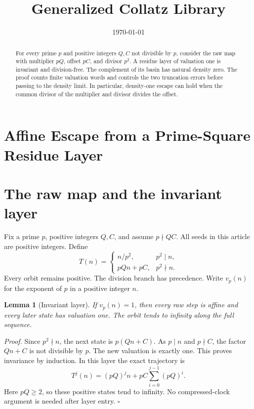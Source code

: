 \documentclass[11pt,letterpaper]{article}
\title{Generalized Collatz Library}
\author{}
\date{\today}
\newtheorem{lemma}[theorem]{Lemma}
\newenvironment{proof}{\noindent\textit{Proof.}}{\hfill\(\square\)}
\begin{document}
\maketitle
\section*{Affine Escape from a Prime-Square Residue Layer}

\begin{abstract}
For every prime \(p\) and positive integers \(Q,C\) not divisible by \(p\), consider the raw map with multiplier \(pQ\), offset \(pC\), and divisor \(p^2\). A residue layer of valuation one is invariant and division-free. The complement of its basin has natural density zero. The proof counts finite valuation words and controls the two truncation errors before passing to the density limit. In particular, density-one escape can hold when the common divisor of the multiplier and divisor divides the offset.
\end{abstract}

\section{The raw map and the invariant layer}

Fix a prime \(p\), positive integers \(Q,C\), and assume \(p\nmid Q C\).
All seeds in this article are positive integers. Define
\[
T(n)=
\begin{cases}
n/p^2,&p^2\mid n,\\
pQn+pC,&p^2\nmid n.
\end{cases}
\]
Every orbit remains positive. The division branch has precedence.
Write \(v_p(n)\) for the exponent of \(p\) in a positive integer \(n\).

\begin{lemma}[Invariant layer]
\label{lem:layer}
If \(v_p(n)=1\), then every raw step is affine and every later state has valuation one. The orbit tends to infinity along the full sequence.
\end{lemma}

\begin{proof}
Since \(p^2\nmid n\), the next state is \(p(Qn+C)\).
As \(p\mid n\) and \(p\nmid C\), the factor \(Qn+C\) is not divisible by \(p\).
The new valuation is exactly one. This proves invariance by induction.
In this layer the exact trajectory is
\[
T^j(n)=(pQ)^j n+pC\sum_{i=0}^{j-1}(pQ)^i.
\]
Here \(pQ\ge2\), so these positive states tend to infinity. No compressed-clock argument is needed after layer entry.
\end{proof}
\end{document}
